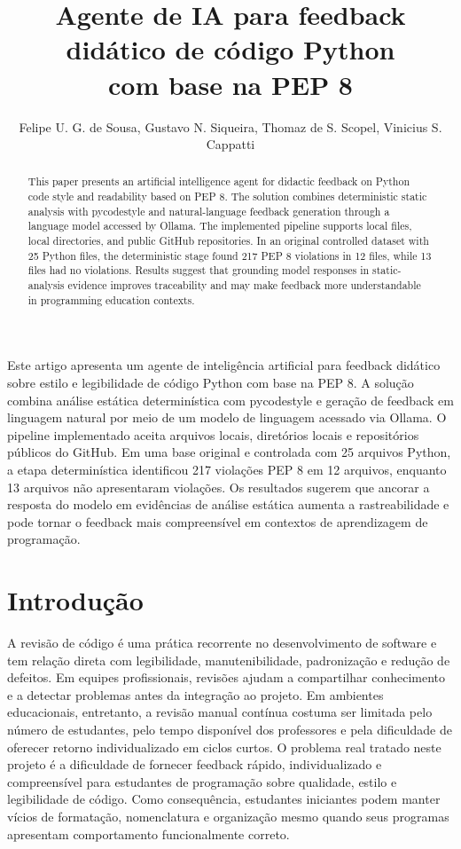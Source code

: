 \documentclass[12pt]{article}
\title{Agente de IA para feedback didático de código Python\\ com base na PEP 8}
\author{Felipe U. G. de Sousa\inst{1}, Gustavo N. Siqueira\inst{1},
Thomaz de S. Scopel\inst{1}, Vinicius S. Cappatti\inst{1}}
\begin{document}
\maketitle

\begin{abstract}
This paper presents an artificial intelligence agent for didactic feedback on
Python code style and readability based on PEP 8. The solution combines
deterministic static analysis with pycodestyle and natural-language feedback
generation through a language model accessed by Ollama. The implemented
pipeline supports local files, local directories, and public GitHub
repositories. In an original controlled dataset with 25 Python files, the
deterministic stage found 217 PEP 8 violations in 12 files, while 13 files had
no violations. Results suggest that grounding model responses in static-analysis
evidence improves traceability and may make feedback more understandable in
programming education contexts.
\end{abstract}

\begin{resumo}
Este artigo apresenta um agente de inteligência artificial para feedback
didático sobre estilo e legibilidade de código Python com base na PEP 8. A
solução combina análise estática determinística com pycodestyle e geração de
feedback em linguagem natural por meio de um modelo de linguagem acessado via
Ollama. O pipeline implementado aceita arquivos locais, diretórios locais e
repositórios públicos do GitHub. Em uma base original e controlada com 25
arquivos Python, a etapa determinística identificou 217 violações PEP 8 em 12
arquivos, enquanto 13 arquivos não apresentaram violações. Os resultados sugerem
que ancorar a resposta do modelo em evidências de análise estática aumenta a
rastreabilidade e pode tornar o feedback mais compreensível em contextos de
aprendizagem de programação.
\end{resumo}

\section{Introdução}

A revisão de código é uma prática recorrente no desenvolvimento de software e
tem relação direta com legibilidade, manutenibilidade, padronização e redução
de defeitos. Em equipes profissionais, revisões ajudam a compartilhar
conhecimento e a detectar problemas antes da integração ao projeto. Em ambientes
educacionais, entretanto, a revisão manual contínua costuma ser limitada pelo
número de estudantes, pelo tempo disponível dos professores e pela dificuldade
de oferecer retorno individualizado em ciclos curtos. O problema real tratado
neste projeto é a dificuldade de fornecer feedback rápido, individualizado e
compreensível para estudantes de programação sobre qualidade, estilo e
legibilidade de código. Como consequência, estudantes iniciantes podem manter
vícios de formatação, nomenclatura e organização mesmo quando seus programas
apresentam comportamento funcionalmente correto.
\end{document}
